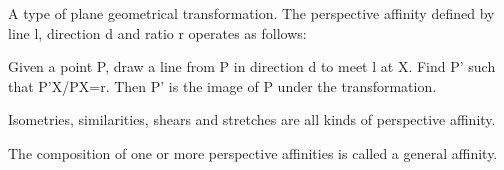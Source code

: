 A type of plane geometrical transformation. The perspective affinity defined by
line l, direction d and ratio r operates as follows:
\par
Given a point P, draw a line from P in direction d to meet l at X. Find
P' such that P'X/PX=r. Then P' is the image of P under the transformation.
\par
Isometries, similarities, shears and stretches are all kinds of perspective
affinity.
\par
The composition of one or more perspective affinities is called a general affinity.